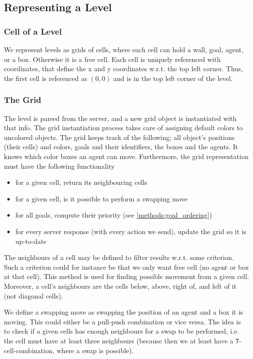 \subsection{Representing a Level}
\label{sec:representing a level}

\subsubsection{Cell of a Level}

We represent levels as grids of cells, where each cell can hold a wall, goal, agent, or a box.
Otherwise it is a free cell.
Each cell is uniquely referenced with coordinates, that define the x and y coordinates w.r.t. the top left corner.
Thus, the first cell is referenced as $(0,0)$ and is in the top left corner of the level.

\subsubsection{The Grid}

The level is parsed from the server, and a new grid object is instantiated with that info.
The grid instantiation process takes care of assigning default colors to uncolored objects.
The grid keeps track of the following; all object's positions (their cells) and colors, goals and their identifiers, the boxes and the agents.
It knows which color boxes an agent can move.
Furthermore, the grid representation must have the following functionality
%
\begin{itemize}
  \item for a given cell, return its neighbouring cells
  \item for a given cell, is it possible to perform a swapping move
  \item for all goals, compute their priority (see \cref{methods:goal_ordering})
  \item for every server response (with every action we send), update the grid so it is up-to-date
\end{itemize}
%
The neighbours of a cell may be defined to filter results w.r.t. some criterion.
Such a criterion could for instance be that we only want free cell (no agent or box at that cell).
This method is used for finding possible movement from a given cell.
Moreover, a cell's neighbours are the cells below, above, right of, and left of it (not diagonal cells).

We define a swapping move as swapping the position of an agent and a box it is moving.
This could either be a pull-push combination or vice versa.
The idea is to check if a given cells has enough neighbours for a swap to be performed, i.e. the cell must have at least three neighbours (because then we at least have a \texttt{T}-cell-combination, where a swap is possible).

